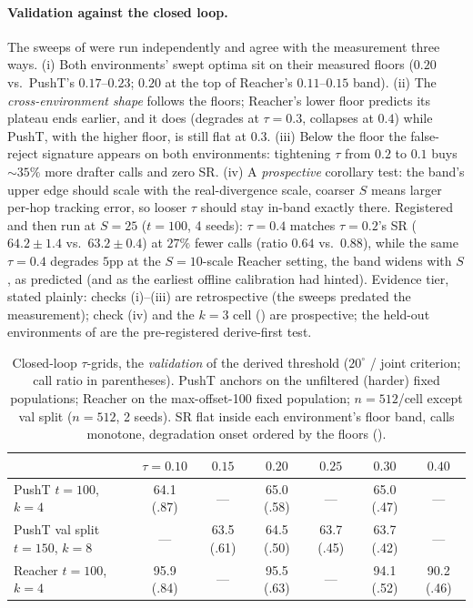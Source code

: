 \documentclass{article}
\newcommand{\degc}[1]{$#1^\circ$}
\begin{document}
\paragraph{Validation against the closed loop.} The sweeps of 
were run independently and agree with the measurement three ways. (i) Both
environments' swept optima sit on their measured floors ($0.20$ vs.\ PushT's
$0.17$--$0.23$; $0.20$ at the top of Reacher's $0.11$--$0.15$ band). (ii) The
\emph{cross-environment shape} follows the floors; Reacher's lower floor predicts
its plateau ends earlier, and it does (degrades at $\tau{=}0.3$, collapses at $0.4$)
while PushT, with the higher floor, is still flat at $0.3$. (iii) Below the floor the
false-reject signature appears on both environments: tightening $\tau$ from $0.2$ to
$0.1$ buys ${\sim}35\%$ more drafter calls and zero SR. (iv) A \emph{prospective}
corollary test: the band's upper edge should scale with the real-divergence scale, coarser $S$ means larger per-hop tracking error, so looser $\tau$ should stay
in-band exactly there. Registered and then run at $S{=}25$ ($t{=}100$, 4 seeds):
$\tau{=}0.4$ matches $\tau{=}0.2$'s SR ($64.2{\pm}1.4$ vs.\ $63.2{\pm}0.4$) at
$27\%$ fewer calls (ratio $0.64$ vs.\ $0.88$), while the same $\tau{=}0.4$ degrades
$5$pp at the $S{=}10$-scale Reacher setting, the band widens with $S$, as
predicted (and as the earliest offline calibration had hinted). Evidence tier,
stated plainly: checks (i)--(iii) are retrospective (the sweeps predated the
measurement); check (iv) and the $k{=}3$ cell () are prospective;
the held-out environments of  are the pre-registered
derive-first test.

\begin{table}[h]
\centering
\small
\caption{Closed-loop $\tau$-grids, the \emph{validation} of the derived threshold
(\degc{20} / joint criterion; call ratio in parentheses). PushT anchors on the
unfiltered (harder) fixed populations; Reacher on the max-offset-100 fixed
population; $n{=}512$/cell except val split ($n{=}512$, 2 seeds). SR flat inside
each environment's floor band, calls monotone, degradation onset ordered by the
floors ().}
\label{tab:taugrid}
\begin{tabular}{lcccccc}
\toprule
& $\tau{=}0.10$ & $0.15$ & $0.20$ & $0.25$ & $0.30$ & $0.40$ \\
\midrule
PushT $t{=}100$, $k{=}4$        & 64.1 (.87) & --- & 65.0 (.58) & --- & 65.0 (.47) & --- \\
PushT val split $t{=}150$, $k{=}8$ & --- & 63.5 (.61) & 64.5 (.50) & 63.7 (.45) & 63.7 (.42) & --- \\
Reacher $t{=}100$, $k{=}4$      & 95.9 (.84) & --- & 95.5 (.63) & --- & 94.1 (.52) & 90.2 (.46) \\
\bottomrule
\end{tabular}
\end{table}
\end{document}

